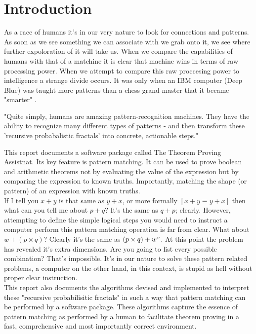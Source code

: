 \documentclass{article}
\newcommand{\enterProblemHeader}[1]{
\nobreak\extramarks{#1}{#1}\nobreak
\nobreak\extramarks{#1}{#1}\nobreak
}
\newcommand{\exitProblemHeader}[1]{
\nobreak\extramarks{#1}{#1 continued on next page\ldots}\nobreak
\nobreak\extramarks{#1}{}\nobreak
}
\newcounter{homeworkProblemCounter} %
\newcommand{\homeworkProblemName}{}
\newenvironment{homeworkProblem}[1][
 \arabic{homeworkProblemCounter}]{ %
\stepcounter{homeworkProblemCounter} %
\renewcommand{\homeworkProblemName}{#1} %
\section{\homeworkProblemName} %
\enterProblemHeader{} %
}{
\exitProblemHeader{} %
}
\begin{document}

\begin{homeworkProblem}[Introduction]

As a race of humans it's in our very nature to look for connections and patterns. As soon as we see something we can associate with we grab onto it, we see where further expoloration of it will take us. When we compare the capabilities of humans with that of a matchine it is clear that machine wins in terms of raw processing power. When we attempt to compare this raw proccesing power to intelligence a strange divide occurs. It was only when an IBM computer (Deep Blue) was taught more patterns than a chess grand-master that it became "smarter" \cite{DEEPBLUE:1997}.

\begin{displayquote}
"Quite simply, humans are amazing pattern-recognition machines. They have the ability to recognize many different types of patterns - and then transform these  'recursive probabalistic fractals' into concrete, actionable steps."\cite{PROBFRACT}
\end{displayquote}

This report documents a software package called The Theorem Proving Assistnat. Its key feature is pattern matching. It can be used to prove boolean and arithmetic theorems not by evaluating the value of the expression but by comparing the expression to known truths. Importantly, matching the shape (or pattern) of an expression with known truths.\\

If I tell you $x+y$ is that same as $y+x$, or more formally $[x + y \equiv y + x]$ then what can you tell me about $p + q$? It's the same as $q + p$; clearly. However, attempting to define the simple logical steps you would need to instruct a computer perform this pattern matching operation is far from clear. What about $w+(p \times q)$? Clearly it's the same as $(p \times q)+w"$. At this point the problem has revealed it's extra dimensions. Are you going to list every possible combination? That's impossible. It's in our nature to solve these pattern related problems, a computer on the other hand, in this context, is stupid as hell without proper clear instruction.\\

This report also documents the algorithms devised and implemented to interpret these "recursive probabilisitic fractals" in such a way that pattern matching can be performed by a software package. These algorithms capture the essence of pattern matching as performed by a human to facilitate theorem proving in a fast, comprehensive and most importantly correct environment.

\newpage
\end{homeworkProblem}
\end{document}
